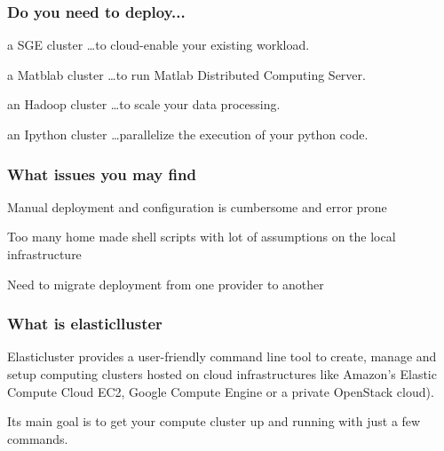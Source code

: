 \documentclass[english,serif,mathserif,usenames,dvipsnames]{beamer}
\begin{document}
\begin{frame}
  \frametitle{Do you need to deploy...}

  \begin{block}{a SGE cluster}
    \dots to cloud-enable your existing workload.
  \end{block}

  \begin{block}{a Matblab cluster}
    \dots to run Matlab Distributed Computing Server.
  \end{block}

  \begin{block}{an Hadoop cluster}
    \dots to scale your data processing.
  \end{block}

  \begin{block}{an Ipython cluster}
    \dots parallelize the execution of your python code.
  \end{block}

\end{frame}

\begin{frame}
  \frametitle{What issues you may find}
  \begin{block}{}
    Manual deployment and configuration is cumbersome and error prone
  \end{block}
  \begin{block}{}
    Too many home made shell scripts with lot of assumptions on the local infrastructure
  \end{block}
  \begin{block}{}
    Need to migrate deployment from one provider to another
  \end{block}
\end{frame}

\begin{frame}
  \frametitle{What is elasticlluster}
  \begin{block}{}
    Elasticluster provides a user-friendly {\color{Blue}command line} tool to {\color{Blue}create, manage and setup} computing clusters hosted on cloud infrastructures like Amazon's Elastic Compute Cloud EC2, Google Compute Engine or a private OpenStack cloud). \\
  \end{block}
  \begin{block}{}
    Its main goal is to get your compute cluster {\color{Blue}up and running} with just a few commands.
  \end{block}
\end{frame}
\end{document}
